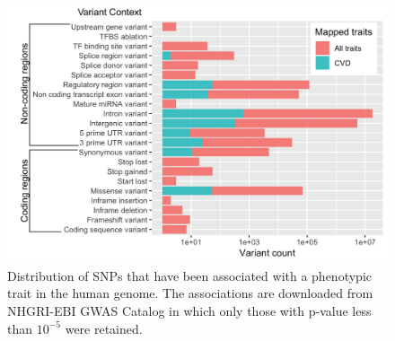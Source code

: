 \documentclass[letter]{bioinfo}
\begin{document}
	\begin{figure}[!tpb]
		\includegraphics[width=1\linewidth]{variant_contexts}
		\caption{Distribution of SNPs that have been associated with a phenotypic trait in the human genome. The associations are downloaded from NHGRI-EBI GWAS Catalog in which only those with p-value less than $10^{-5}$ were retained.}
		\label{fig:variant_context}
	\end{figure}
	
\end{document}

